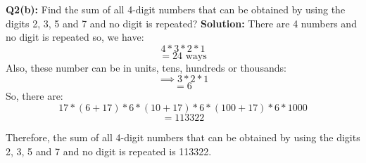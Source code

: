 \documentclass{article}
\begin{document}
\begin{flushleft}
\textbf{Q2(b): } Find the sum of all 4-digit numbers that can be obtained by using the digits 2, 3, 5 and 7 and no digit is repeated?
\newline
\newline
\textbf{Solution: } There are 4 numbers and no digit is repeated so, we have:
\[4 * 3 * 2 * 1\]
\[= 24 \text{ ways}\]
Also, these number can be in units, tens, hundreds or thousands:
\[\implies 3 * 2 * 1\]
\[ = 6\]
So, there are:
\[17 * (6 + 17) * 6 * (10 + 17) * 6 * (100 + 17) * 6 * 1000\]
\[= 113322\]

Therefore, the sum of all 4-digit numbers that can be obtained by using the digits 2, 3, 5 and 7 and no digit
is repeated is 113322.

\end{flushleft} 
\begin{flushleft}

\end{flushleft}
\end{document}
